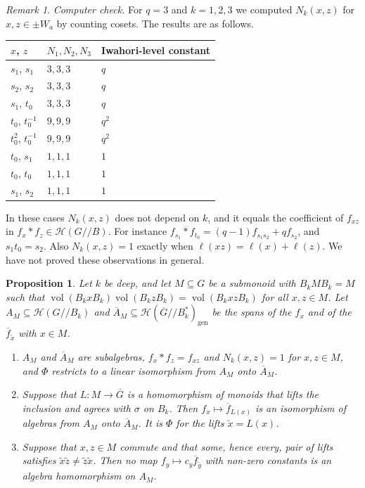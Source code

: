 \documentclass[12pt,letterpaper]{amsart}
\numberwithin{equation}{section}
\newtheorem{proposition}[theorem]{Proposition}
\theoremstyle{definition}
\theoremstyle{remark}
\newtheorem{vremark}{Remark}
\DeclareMathOperator{\vol}{vol}
\newcommand{\cH}{\mathcal{H}}
\newcommand{\Gbar}{\overline{G}}
\newcommand{\gen}{\mathrm{gen}}
\newcommand{\fbar}{\overline{f}}
\newcommand{\Hgen}{\cH(\Gbar/\!/B_k^*)_{\gen}}
\newcommand{\Hlin}{\cH(G/\!/B_k)}
\begin{document}
\begin{vremark}
\label{vrem:Nk}
\emph{Computer check.} For $q=3$ and $k=1,2,3$ we computed $N_k(x,z)$
for $x,z\in\pm W_a$ by counting cosets. The results are as follows.
\begin{center}
\begin{tabular}{@{}lll@{}}
\toprule
$x$, $z$ & $N_1,N_2,N_3$ & Iwahori-level constant \\
\midrule
$s_1$, $s_1$ & $3,3,3$ & $q$ \\
$s_2$, $s_2$ & $3,3,3$ & $q$ \\
$s_1$, $t_0$ & $3,3,3$ & $q$ \\
$t_0$, $t_0^{-1}$ & $9,9,9$ & $q^2$ \\
$t_0^2$, $t_0^{-1}$ & $9,9,9$ & $q^2$ \\
$t_0$, $s_1$ & $1,1,1$ & $1$ \\
$t_0$, $t_0$ & $1,1,1$ & $1$ \\
$s_1$, $s_2$ & $1,1,1$ & $1$ \\
\bottomrule
\end{tabular}
\end{center}
In these cases $N_k(x,z)$ does not depend on $k$, and it equals the
coefficient of $f_{xz}$ in $f_x*f_z\in\cH(G/\!/B)$. For instance
$f_{s_1}*f_{t_0}=(q-1)f_{s_1s_2}+qf_{s_2}$, and $s_1t_0=s_2$. Also
$N_k(x,z)=1$ exactly when $\ell(xz)=\ell(x)+\ell(z)$. We have not proved
these observations in general.
\end{vremark}

\begin{proposition}
\label{prop:monoid}
Let $k$ be deep, and let $M\subseteq G$ be a submonoid with
$B_kMB_k=M$ such that $\vol(B_kxB_k)\vol(B_kzB_k)=\vol(B_kxzB_k)$ for
all $x,z\in M$. Let $A_M\subseteq\Hlin$ and $\overline A_M\subseteq\Hgen$
be the spans of the $f_x$ and of the $\fbar_{\tilde x}$ with $x\in M$.
\begin{enumerate}[leftmargin=2em,label=(\alph*)]
\item $A_M$ and $\overline A_M$ are subalgebras, $f_x*f_z=f_{xz}$ and
$N_k(x,z)=1$ for $x,z\in M$, and $\Phi$ restricts to a linear
isomorphism from $A_M$ onto $\overline A_M$.
\item Suppose that $L:M\to\Gbar$ is a homomorphism of monoids that
lifts the inclusion and agrees with $\sigma$ on $B_k$. Then
$f_x\mapsto\fbar_{L(x)}$ is an isomorphism of algebras from $A_M$ onto
$\overline A_M$. It is $\Phi$ for the lifts $\tilde x=L(x)$.
\item Suppose that $x,z\in M$ commute and that some, hence every, pair
of lifts satisfies $\tilde x\tilde z\neq\tilde z\tilde x$. Then no map
$f_y\mapsto c_y\fbar_{\tilde y}$ with non-zero constants is an algebra
homomorphism on $A_M$.
\end{enumerate}
\end{proposition}
\end{document}
